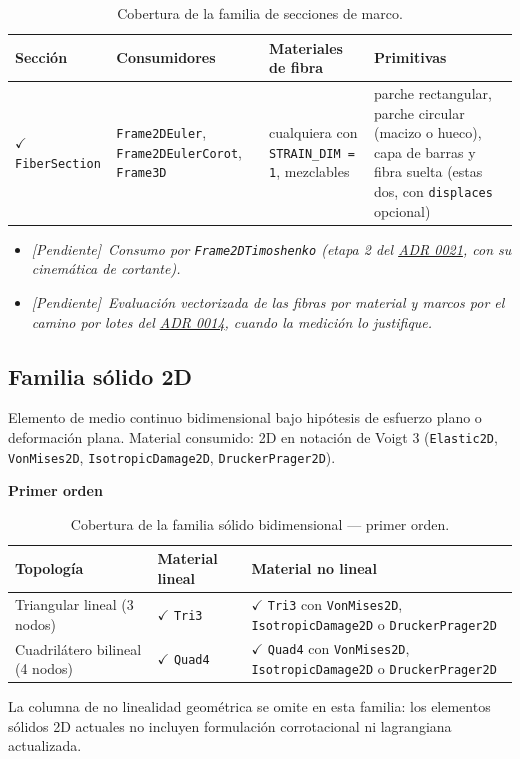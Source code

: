 \documentclass[11pt,oneside]{report}
\newcommand{\pendiente}[1]{\textcolor{pendienteorange}{\textit{[Pendiente]}~\textcolor{pendienteorange}{\textit{#1}}}}
\begin{document}
\begin{table}[h]
\centering
\caption{Cobertura de la familia de secciones de marco.}
\begin{tabularx}{\textwidth}{YYYY}
\hline
\textbf{Sección} & \textbf{Consumidores} & \textbf{Materiales de fibra} & \textbf{Primitivas} \\
\hline
\ensuremath{\checkmark} \texttt{FiberSection} & \texttt{Frame2DEuler}, \texttt{Frame2DEulerCorot}, \texttt{Frame3D} & cualquiera con \texttt{STRAIN\_DIM = 1}, mezclables & parche rectangular, parche circular (macizo o hueco), capa de barras y fibra suelta (estas dos, con \texttt{displaces} opcional) \\
\hline
\end{tabularx}
\end{table}
\begin{itemize}
  \item \pendiente{Consumo por \texttt{Frame2DTimoshenko} (etapa 2 del \hyperref[adr:0021]{ADR 0021}, con su cinemática de cortante).}
  \item \pendiente{Evaluación vectorizada de las fibras por material y marcos por el camino por lotes del \hyperref[adr:0014]{ADR 0014}, cuando la medición lo justifique.}
\end{itemize}

\subsection{Familia sólido 2D}

Elemento de medio continuo bidimensional bajo hipótesis de esfuerzo plano o deformación plana. Material consumido: 2D en notación de Voigt 3 (\texttt{Elastic2D}, \texttt{VonMises2D}, \texttt{IsotropicDamage2D}, \texttt{DruckerPrager2D}).

\textbf{Primer orden}

\begin{table}[h]
\centering
\caption{Cobertura de la familia sólido bidimensional --- primer orden.}
\begin{tabularx}{\textwidth}{YYY}
\hline
\textbf{Topología} & \textbf{Material lineal} & \textbf{Material no lineal} \\
\hline
Triangular lineal (3 nodos) & \ensuremath{\checkmark} \texttt{Tri3} & \ensuremath{\checkmark} \texttt{Tri3} con \texttt{VonMises2D}, \texttt{IsotropicDamage2D} o \texttt{DruckerPrager2D} \\
Cuadrilátero bilineal (4 nodos) & \ensuremath{\checkmark} \texttt{Quad4} & \ensuremath{\checkmark} \texttt{Quad4} con \texttt{VonMises2D}, \texttt{IsotropicDamage2D} o \texttt{DruckerPrager2D} \\
\hline
\end{tabularx}
\end{table}
La columna de no linealidad geométrica se omite en esta familia: los elementos sólidos 2D actuales no incluyen formulación corrotacional ni lagrangiana actualizada.
\end{document}
